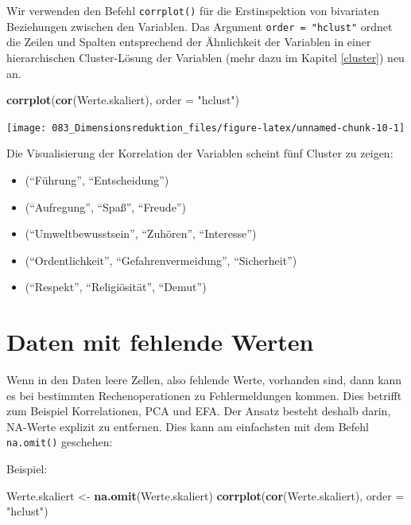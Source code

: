\documentclass[12pt,ngerman,]{book}
\makeatletter
\newenvironment{Shaded}{\begin{snugshade}}{\end{snugshade}}
\newcommand{\KeywordTok}[1]{\textcolor[rgb]{0.13,0.29,0.53}{\textbf{#1}}}
\newcommand{\DataTypeTok}[1]{\textcolor[rgb]{0.13,0.29,0.53}{#1}}
\newcommand{\StringTok}[1]{\textcolor[rgb]{0.31,0.60,0.02}{#1}}
\newcommand{\NormalTok}[1]{#1}
\providecommand{\tightlist}{%
  \setlength{\itemsep}{0pt}\setlength{\parskip}{0pt}}
\newenvironment{kframe}{%
\medskip{}
\setlength{\fboxsep}{.8em}
 \def\at@end@of@kframe{}%
 \ifinner\ifhmode%
  \def\at@end@of@kframe{\end{minipage}}%
  \begin{minipage}{\columnwidth}%
 \fi\fi%
 \def\FrameCommand##1{\hskip\@totalleftmargin \hskip-\fboxsep
 \colorbox{shadecolor}{##1}\hskip-\fboxsep
     \hskip-\linewidth \hskip-\@totalleftmargin \hskip\columnwidth}%
 \MakeFramed {\advance\hsize-\width
   \@totalleftmargin\z@ \linewidth\hsize
   \@setminipage}}%
 {\par\unskip\endMakeFramed%
 \at@end@of@kframe}
\renewenvironment{Shaded}{\begin{kframe}}{\end{kframe}}
\theoremstyle{definition}
\theoremstyle{definition}
\theoremstyle{remark}
\makeatother
\begin{document}
Wir verwenden den Befehl \texttt{corrplot()} für die Erstinspektion von
bivariaten Beziehungen zwischen den Variablen. Das Argument
\texttt{order\ =\ "hclust"} ordnet die Zeilen und Spalten entsprechend
der Ähnlichkeit der Variablen in einer hierarchischen Cluster-Lösung der
Variablen (mehr dazu im Kapitel \ref{cluster}) neu an.

\begin{Shaded}
\begin{Highlighting}[]
\KeywordTok{corrplot}\NormalTok{(}\KeywordTok{cor}\NormalTok{(Werte.skaliert), }\DataTypeTok{order =} \StringTok{"hclust"}\NormalTok{)}
\end{Highlighting}
\end{Shaded}

\begin{center}\texttt{[image: 083\_Dimensionsreduktion\_files/figure-latex/unnamed-chunk-10-1]} \end{center}

Die Visualisierung der Korrelation der Variablen scheint fünf Cluster zu
zeigen:

\begin{itemize}
\tightlist
\item
  (``Führung'', ``Entscheidung'')
\item
  (``Aufregung'', ``Spaß'', ``Freude'')
\item
  (``Umweltbewusstsein'', ``Zuhören'', ``Interesse'')
\item
  (``Ordentlichkeit'', ``Gefahrenvermeidung'', ``Sicherheit'')
\item
  (``Respekt'', ``Religiösität'', ``Demut'')
\end{itemize}

\section{Daten mit fehlende Werten}\label{daten-mit-fehlende-werten}

Wenn in den Daten leere Zellen, also fehlende Werte, vorhanden sind,
dann kann es bei bestimmten Rechenoperationen zu Fehlermeldungen kommen.
Dies betrifft zum Beispiel Korrelationen, PCA und EFA. Der Ansatz
besteht deshalb darin, NA-Werte explizit zu entfernen. Dies kann am
einfachsten mit dem Befehl \texttt{na.omit()} geschehen:

Beispiel:

\begin{Shaded}
\begin{Highlighting}[]
\NormalTok{Werte.skaliert <-}\StringTok{ }\KeywordTok{na.omit}\NormalTok{(Werte.skaliert)}
\KeywordTok{corrplot}\NormalTok{(}\KeywordTok{cor}\NormalTok{(Werte.skaliert), }\DataTypeTok{order =} \StringTok{"hclust"}\NormalTok{)}
\end{Highlighting}
\end{Shaded}
\end{document}
